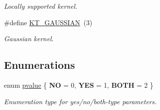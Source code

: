 \begin{CompactItemize}
\begin{CompactList}\small\item\em Locally supported kernel. \item\end{CompactList}\item 
\hypertarget{group__applications__fastsumS2__test_ga11}{
\#define \hyperlink{group__applications__fastsumS2__test_ga11}{KT\_\-GAUSSIAN}~(3)}
\label{group__applications__fastsumS2__test_ga11}

\begin{CompactList}\small\item\em Gaussian kernel. \item\end{CompactList}\end{CompactItemize}
\subsection*{Enumerations}
\begin{CompactItemize}
\item 
enum \hyperlink{group__applications__fastsumS2__test_ga12}{pvalue} \{ {\bf NO} =  0, 
{\bf YES} =  1, 
{\bf BOTH} =  2
 \}
\begin{CompactList}\small\item\em Enumeration type for yes/no/both-type parameters. \item\end{CompactList}\end{CompactItemize}
